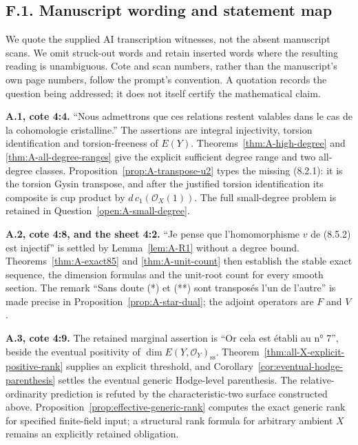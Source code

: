 \subsection{F.1. Manuscript wording and statement map}
We quote the supplied AI transcription witnesses, not the absent manuscript
scans.  We omit struck-out words and retain inserted words where the resulting
reading is unambiguous.  Cote and scan numbers, rather than the manuscript's
own page numbers, follow the prompt's convention.  A quotation records the
question being addressed; it does not itself certify the mathematical claim.

\par\smallskip\noindent\textbf{A.1, cote 4:4.}
``Nous admettrons que ces relations restent valables dans le cas de la
cohomologie cristalline.''  The assertions are integral injectivity, torsion
identification and torsion-freeness of $E(Y)$.
Theorems~\ref{thm:A-high-degree} and \ref{thm:A-all-degree-ranges}
give the explicit sufficient degree range and two all-degree classes.
Proposition~\ref{prop:A-transpose-u2} types the missing (8.2.1): it is the
torsion Gysin transpose, and after the justified torsion identification its
composite is cup product by $d\,c_1(\mathcal O_X(1))$.
The full small-degree problem is retained in
Question~\ref{open:A-small-degree}.

\par\smallskip\noindent\textbf{A.2, cote 4:8, and the sheet 4:2.}
``Je pense que l'homomorphisme $v$ de (8.5.2) est injectif'' is settled by
Lemma~\ref{lem:A-R1} without a degree bound.
Theorems~\ref{thm:A-exact85} and \ref{thm:A-unit-count} then establish
the stable exact sequence, the dimension formulas and the unit-root count
for every smooth section.  The remark ``Sans doute (*) et (**) sont
transposés l'un de l'autre'' is made precise in
Proposition~\ref{prop:A-star-dual}; the adjoint operators are $F$ and $V$.

\par\smallskip\noindent\textbf{A.3, cote 4:9.}
The retained marginal assertion is ``Or cela est établi au n° 7'', beside
the eventual positivity of $\dim E(Y,\mathcal O_Y)_{\mathrm{ss}}$.
Theorem~\ref{thm:all-X-explicit-positive-rank} supplies an explicit
threshold, and Corollary~\ref{cor:eventual-hodge-parenthesis} settles
the eventual generic Hodge-level parenthesis.  The relative-ordinarity
prediction is refuted by the characteristic-two surface constructed above.
Proposition~\ref{prop:effective-generic-rank} computes the exact generic
rank for specified finite-field input; a structural rank formula for
arbitrary ambient $X$ remains an explicitly retained obligation.

